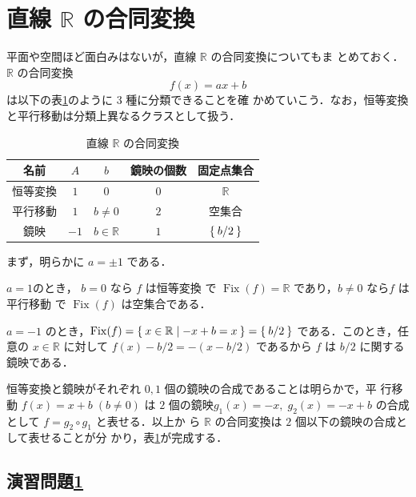 \documentclass[11pt, uplatex, dvipdfmx, titlepage]{jsarticle}
\DeclareMathOperator{\Fix}{Fix}
\theoremstyle{definition}
\begin{document}
\newpage

\section{ 直線 $\mathbb{R}$ の合同変換}\label{sec:1dim}

平面や空間ほど面白みはないが，直線 $\mathbb{R}$ の合同変換についてもま
とめておく．$\mathbb{R}$ の合同変換
\[
  f(x) = a x + b
\]
は以下の表\ref{tab:classification1}のように $3$ 種に分類できることを確
かめていこう．なお，恒等変換と平行移動は分類上異なるクラスとして扱う．
\begin{table}[h]
  \centering
  \begin{tabular}[h]{|c|c|c|c|c|}\hline
    名前 & $A$ & $b$ & 鏡映の個数 & 固定点集合\\ \hline
    恒等変換 & $1$ & $0$ & $0$ & $\mathbb{R}$\\ 
    平行移動 & $1$ & $b \neq 0$ & $2$ & 空集合\\
    鏡映 & $-1$ & $b \in \mathbb{R}$ & $1$ & $\Set{b/2}$ \\ \hline
  \end{tabular}
  \caption{直線 $\mathbb{R}$ の合同変換}
  \label{tab:classification1}
\end{table}

まず，明らかに $a=\pm 1$ である．

$a=1$のとき， $b=0$ なら $f$ は恒等変換
で $\Fix(f)=\mathbb{R}$ であり，$b\neq 0$ なら$f$ は平行移動
で $\Fix(f)$ は空集合である．

$a=-1$ のとき，$\Fix(f) = \Set{x \in \mathbb{R} | -x+b=x} = \Set{b/2}$
である．このとき，任意の $x \in \mathbb{R}$ に対して $f(x)-b/2 =
-(x-b/2)$ であるから $f$ は $b/2$ に関する鏡映である．

恒等変換と鏡映がそれぞれ $0, 1$ 個の鏡映の合成であることは明らかで，平
行移動 $f(x) = x+b \; (b \neq 0)$ は $2$ 個の鏡映$g_1(x) = -x, \;
g_2(x)=-x+b$ の合成として $f=g_2 \circ g_1$ と表せる．以上か
ら $\mathbb{R}$ の合同変換は $2$ 個以下の鏡映の合成として表せることが分
かり，表\ref{tab:classification1}が完成する．

\subsection*{演習問題\ref{sec:1dim}}
\end{document}
